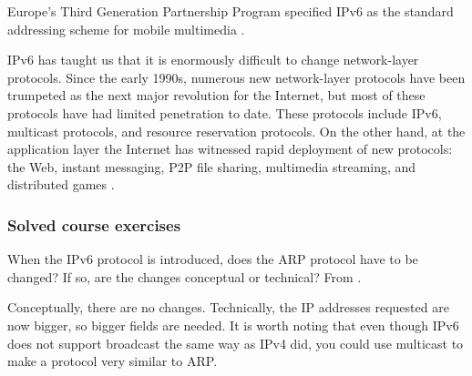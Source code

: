 \documentclass[12pt, oneside]{book}
\begin{document}
Europe's Third Generation Partnership Program specified IPv6 as the standard addressing scheme for mobile multimedia \cite[p.~362]{computer-networking-kurose-2012}.

IPv6 has taught us that it is enormously difficult to change network-layer protocols. Since the early 1990s, numerous new network-layer protocols have been trumpeted as the next major revolution for the
Internet, but most of these protocols have had limited penetration to date.
These protocols include IPv6, multicast protocols, and resource reservation protocols.
On the other hand, at the application layer the Internet has witnessed rapid deployment of new protocols: the Web, instant messaging, P2P file sharing, multimedia streaming, and distributed games \cite[p.~362]{computer-networking-kurose-2012}.

\subsubsection{Solved course exercises}
\setcounter{Exercise}{0}

\begin{Exercise}
When the IPv6 protocol is introduced, does the ARP protocol have to be changed?
If so, are the changes conceptual or technical?
From \cite{computer-networks-tanenbaum-2012}.
\end{Exercise}
\begin{Answer}
Conceptually, there are no changes.
Technically, the IP addresses requested are now bigger, so bigger fields are needed.
It is worth noting that even though IPv6 does not support broadcast the same way as IPv4 did, you could use multicast to make a protocol very similar to ARP.
\end{Answer}
\end{document}
